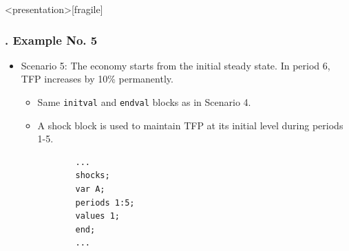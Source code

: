 \documentclass[11pt,aspectratio=169]{beamer}
\begin{document}
\begin{frame}<presentation>[fragile]
	\frametitle{{\thesection.\thesubsection} Example No. 5}
	\begin{itemize}
		\item Scenario 5: The economy starts from the initial steady state. In period 6, TFP increases by 10\% permanently. 
			\begin{itemize}
				\item Same \texttt{initval} and \texttt{endval} blocks as in Scenario 4.
				\item A shock block is used to maintain TFP at its initial level during periods 1-5.
			\end{itemize}
		\begin{verbatim}
		   ...
		   shocks;
		   var A;
		   periods 1:5;
		   values 1;
		   end;
		   ...
		\end{verbatim}
	\end{itemize}
\end{frame}
\end{document}
